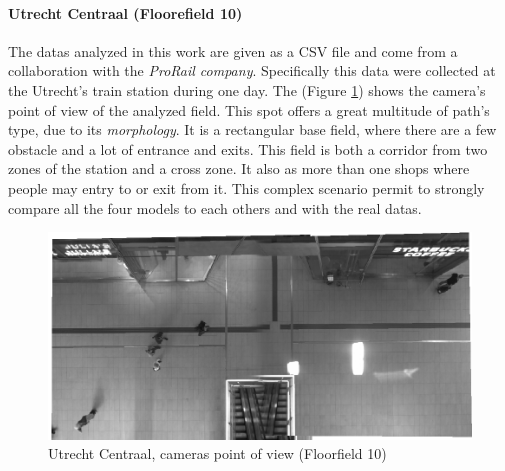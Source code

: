 \documentclass[class=article, crop=false]{standalone}
\begin{document}



\paragraph{Utrecht Centraal (Floorefield 10)}
The datas analyzed in this work are given as a CSV file and come from a collaboration with the \emph{ProRail company}.
Specifically this data were collected at the Utrecht’s train station during one day.
The (Figure \ref{fig:trainf10}) shows the camera’s point of view of the analyzed field.
This spot offers a great multitude of path's type, due to its \emph{morphology}. 
It is a rectangular base field, where there are a few obstacle and a lot of entrance and exits.
This field is both a corridor from two zones of the station and a cross zone. 
It also as more than one shops where people may entry to or exit from it.
This complex scenario permit to strongly compare all the four models to each others and with the real datas.

\begin{figure}[h]
\centering
\includegraphics[width=0.4\textheight]{imgs/bg10.png}
\caption{Utrecht Centraal, cameras point of view (Floorfield 10)}
\label{fig:trainf10}
\end{figure}
\end{document}

